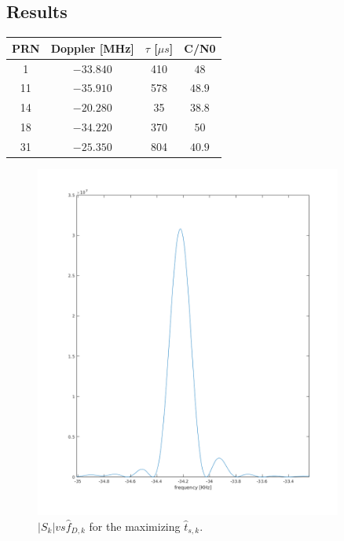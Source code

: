 \subsection{Results}

\begin{tabular}{c|c|c|c}
	PRN & Doppler [MHz] & $\tau$ [$\mu s$] & C/N0   \\
	\hline
	1   & $-33.840$     & 410              & $48$   \\
	11  & $-35.910$     & 578              & $48.9$ \\
	14  & $-20.280$     & 35               & $38.8$ \\
	18  & $-34.220$     & 370              & $50$   \\
	31  & $-25.350$     & 804              & $40.9$ \\
\end{tabular}


\begin{figure}[H]
	\centering
	\includegraphics[width=0.9\textwidth]{figs/Sk_freq.png}
	\caption{$|S_k| vs \hat{f}_{D,k}$ for the maximizing $\hat{t}_{s,k}$.}
	\label{fig:sk_freq}
\end{figure}

